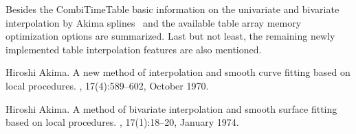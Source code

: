 \documentclass[11pt,a4paper]{article}
\begin{document}
Besides the CombiTimeTable basic information on the univariate and bivariate interpolation by Akima splines~\cite{Akima:1970:NMI:321607.321609, Akima:1974:MBI:360767.360779} and the available table array memory optimization options are summarized. Last but not least, the remaining newly implemented table interpolation features are also mentioned.

\begin{thebibliography}{00}

Hiroshi Akima.
\newblock A new method of interpolation and smooth curve fitting based on local
  procedures.
, 17(4):589--602, October 1970.

Hiroshi Akima.
\newblock A method of bivariate interpolation and smooth surface fitting based
  on local procedures.
, 17(1):18--20, January 1974.

\end{thebibliography}
\end{document}

